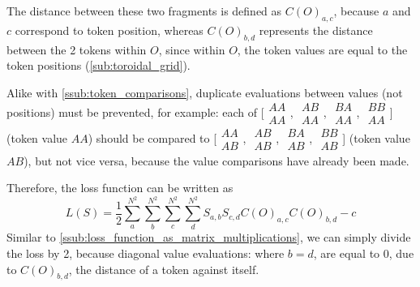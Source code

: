 The distance between these two fragments is defined as $C(O)_{a,c}$, because $a$ and $c$ correspond to token position, whereas $C(O)_{b,d}$ represents the distance between the 2 tokens within $O$, since within $O$, the token values are equal to the token positions (\ref{sub:toroidal_grid}).

Alike with \ref{ssub:token_comparisons}, duplicate evaluations between values (not positions) must be prevented, for example: each of %
[$\begin{smallmatrix}AA\\AA\end{smallmatrix}$,%
$\begin{smallmatrix}AB\\AA\end{smallmatrix}$,%
$\begin{smallmatrix}BA\\AA\end{smallmatrix}$,%
$\begin{smallmatrix}BB\\AA\end{smallmatrix}$] (token value $AA$) should be compared to
[$\begin{smallmatrix}AA\\AB\end{smallmatrix}$,%
$\begin{smallmatrix}AB\\AB\end{smallmatrix}$,%
$\begin{smallmatrix}BA\\AB\end{smallmatrix}$,%
$\begin{smallmatrix}BB\\AB\end{smallmatrix}$] (token value $AB$), but not vice versa, because the value comparisons have already been made.

Therefore, the loss function can be written as
\begin{equation}
    L(S)=\frac{1}{2}\sum_{a}^{N^2} \sum_{b}^{N^2} \sum_{c}^{N^2} \sum_{d}^{N^2} S_{a,b} S_{c,d} C(O)_{a,c}C(O)_{b,d}-c
\end{equation}
Similar to \ref{ssub:loss_function_as_matrix_multiplications}, we can simply divide the loss by 2, because diagonal value evaluations: where $b=d$, are equal to $0$, due to $C(O)_{b,d}$, the distance of a token against itself.


